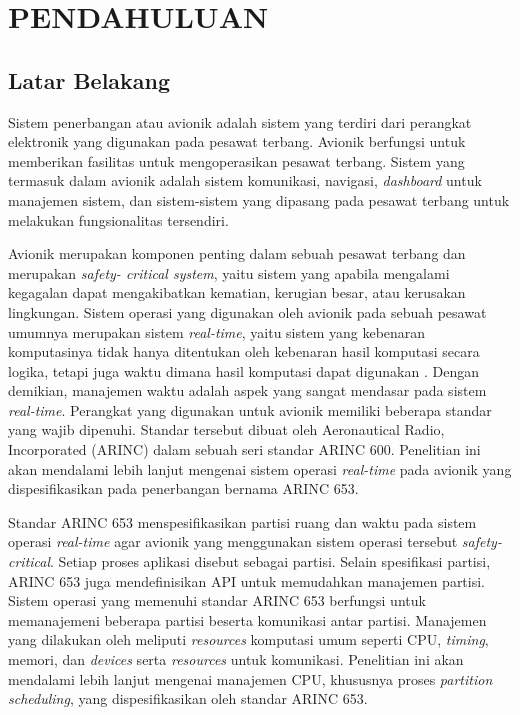 \chapter{PENDAHULUAN}

\section{Latar Belakang}

Sistem penerbangan atau avionik adalah sistem yang terdiri dari perangkat elektronik yang
digunakan pada pesawat terbang. Avionik berfungsi untuk memberikan fasilitas untuk
mengoperasikan pesawat terbang. Sistem yang termasuk dalam avionik adalah sistem komunikasi,
navigasi, \textit{dashboard} untuk manajemen sistem, dan sistem-sistem yang dipasang pada
pesawat terbang untuk melakukan fungsionalitas tersendiri.

Avionik merupakan komponen penting dalam sebuah pesawat terbang dan merupakan \textit{safety\hyp
critical system}, yaitu sistem yang apabila mengalami kegagalan dapat mengakibatkan kematian,
kerugian besar, atau kerusakan lingkungan.  Sistem operasi yang digunakan oleh avionik pada
sebuah pesawat umumnya merupakan sistem \textit{real-time}, yaitu sistem yang kebenaran
komputasinya tidak hanya ditentukan oleh kebenaran hasil komputasi secara logika, tetapi juga
waktu dimana hasil komputasi dapat digunakan \citep[p.~6]{Shin1994}. Dengan demikian, manajemen
waktu adalah aspek yang sangat mendasar pada sistem \textit{real-time}. Perangkat yang digunakan
untuk avionik memiliki beberapa standar yang wajib dipenuhi. Standar tersebut dibuat oleh
Aeronautical Radio, Incorporated (ARINC) dalam sebuah seri standar ARINC 600. Penelitian ini
akan mendalami lebih lanjut mengenai sistem operasi \textit{real-time} pada avionik yang
dispesifikasikan pada penerbangan bernama ARINC 653.

Standar ARINC 653 menspesifikasikan partisi ruang dan waktu pada sistem operasi
\textit{real-time} agar avionik yang menggunakan sistem operasi tersebut
\textit{safety-critical}. Setiap proses aplikasi disebut sebagai partisi.  Selain spesifikasi
partisi, ARINC 653 juga mendefinisikan API untuk memudahkan manajemen partisi.  Sistem operasi
yang memenuhi standar ARINC 653 berfungsi untuk memanajemeni beberapa partisi beserta komunikasi
antar partisi.  Manajemen yang dilakukan oleh meliputi \textit{resources} komputasi umum seperti
CPU, \textit{timing}, memori, dan \textit{devices} serta \textit{resources} untuk komunikasi.
Penelitian ini akan mendalami lebih lanjut mengenai manajemen CPU, khususnya proses
\textit{partition scheduling}, yang dispesifikasikan oleh standar ARINC 653.

